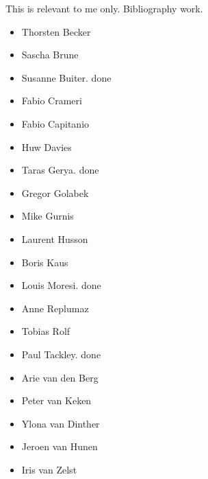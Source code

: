 
This is relevant to me only. Bibliography work.
\begin{itemize}
\item Thorsten Becker
\item Sascha Brune
\item Susanne Buiter. done
\item Fabio Crameri
\item Fabio Capitanio
\item Huw Davies
\item Taras Gerya. done
\item Gregor Golabek
\item Mike Gurnis
\item Laurent Husson
\item Boris Kaus 
\item Louis Moresi. done
\item Anne Replumaz
\item Tobias Rolf
\item Paul Tackley. done
\item Arie van den Berg
\item Peter van Keken 
\item Ylona van Dinther
\item Jeroen van Hunen
\item Iris van Zelst
\end{itemize}
